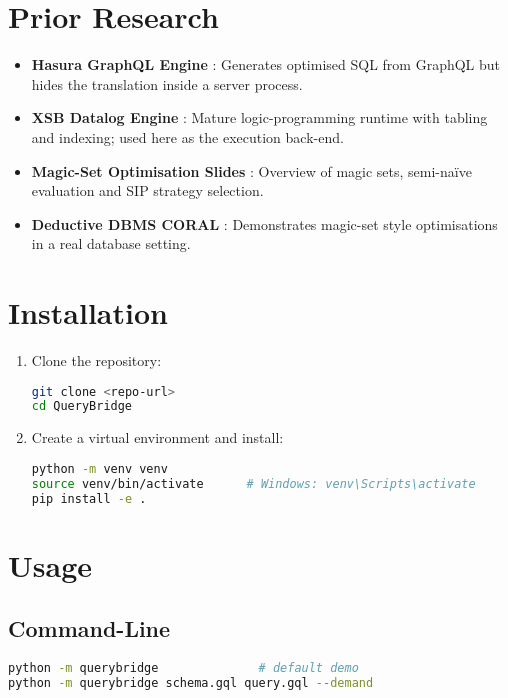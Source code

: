 \documentclass[11pt]{article}
\begin{document}
\section{Prior Research}
\begin{itemize}[leftmargin=1.5em]
  \item \textbf{Hasura GraphQL Engine} \cite{Hasura}: Generates optimised SQL from GraphQL but hides the translation inside a server process.
  \item \textbf{XSB Datalog Engine} \cite{XSB}: Mature logic-programming runtime with tabling and indexing; used here as the execution back-end.
  \item \textbf{Magic-Set Optimisation Slides} \cite{SIPSlides}: Overview of magic sets, semi-naïve evaluation and SIP strategy selection.
  \item \textbf{Deductive DBMS CORAL} \cite{CORAL}: Demonstrates magic-set style optimisations in a real database setting.
\end{itemize}

\section{Installation}
\begin{enumerate}[label=\arabic*.]
  \item Clone the repository:
\begin{lstlisting}[language=bash]
git clone <repo-url>
cd QueryBridge
\end{lstlisting}
  \item Create a virtual environment and install:
\begin{lstlisting}[language=bash]
python -m venv venv
source venv/bin/activate      # Windows: venv\Scripts\activate
pip install -e .
\end{lstlisting}
\end{enumerate}

\section{Usage}
\subsection{Command-Line}
\begin{lstlisting}[language=bash]
python -m querybridge              # default demo
python -m querybridge schema.gql query.gql --demand
\end{lstlisting}
\end{document}
